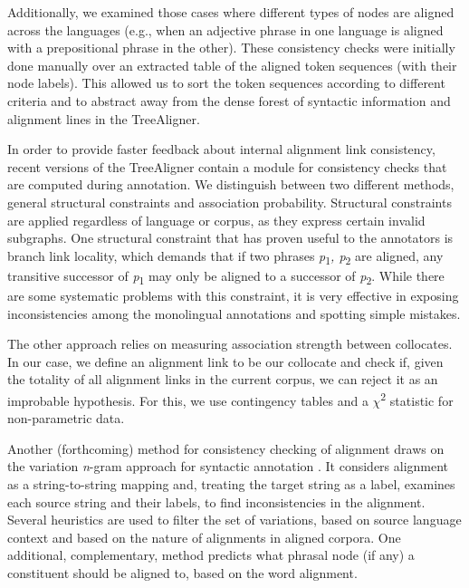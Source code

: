 \documentclass[output=paper]{LSP/langsci}
\begin{document}
Additionally, we examined those cases where different types of nodes are aligned across the languages (e.g., when an adjective phrase in one language is aligned with a prepositional phrase in the other). These consistency checks were initially done manually over an extracted table of the aligned token sequences (with their node labels). This allowed us to sort the token sequences according to different criteria and to abstract away from the dense forest of syntactic information and alignment lines in the TreeAligner. 

In order to provide faster feedback about internal alignment link consistency, recent versions of the TreeAligner contain a module for consistency checks that are computed during annotation. We distinguish between two different methods, general structural constraints and association probability. Structural constraints are applied regardless of language or corpus, as they express certain invalid subgraphs. One structural constraint that has proven useful to the annotators is branch link locality, which demands that if two phrases \textit{p}\textsubscript{1}\textit{, p}\textsubscript{2} are aligned, any transitive successor of \textit{p}\textsubscript{1} may only be aligned to a successor of \textit{p}\textsubscript{2}. While there are some systematic problems with this constraint, it is very effective in exposing inconsistencies among the monolingual annotations and spotting simple mistakes. 
 
The other approach relies on measuring association strength between collocates. In our case, we define an alignment link to be our collocate and check if, given the totality of all alignment links in the current corpus, we can reject it as an improbable hypothesis. For this, we use contingency tables and a \textit{$\chi $}\textsuperscript{2} statistic for non-parametric data. 
 
Another (forthcoming) method for consistency checking of alignment draws on the variation \textit{n}{}-gram approach for syntactic annotation \citep{Dickinson2003b,Dickinson2005}. It considers alignment as a string-to-string mapping and, treating the target string as a label, examines each source string and their labels, to find inconsistencies in the alignment. Several heuristics are used to filter the set of variations, based on source language context and based on the nature of alignments in aligned corpora. One additional, complementary, method predicts what phrasal node (if any) a constituent should be aligned to, based on the word alignment. 
\end{document}
